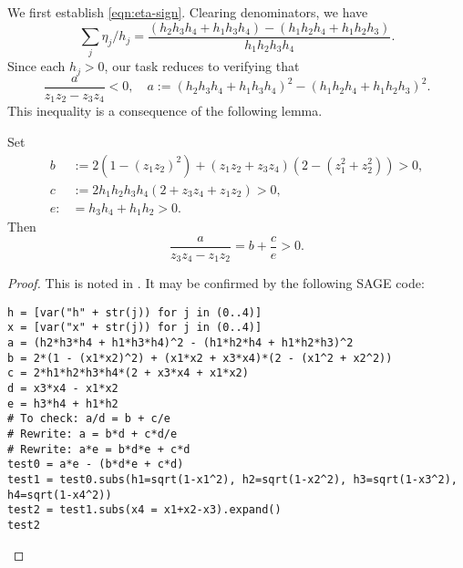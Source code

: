\documentclass[reqno]{amsart} 
\begin{document}
We first establish \eqref{eqn:eta-sign}.  Clearing denominators, we have
\begin{equation*}
  \sum _j \eta _j  / h _j
  = \frac{(h_2 h_3 h_4 + h_1 h_3 h_4) - (h_1 h_2 h_4 + h_1 h_2 h_3)}{ h_1 h_2 h_3 h_4}.
\end{equation*}
Since each $h_j > 0$, our task reduces to verifying that
\begin{equation*}
  \frac{a}{z_1 z_2 - z_3 z_4} < 0,
  \quad a := (h_2 h_3 h_4 + h_1 h_3 h_4)^2 - (h_1 h_2 h_4 + h_1 h_2 h_3)^2.
\end{equation*}
This inequality is a consequence of the following lemma.
\begin{lemma}
Set
\begin{align*}
  b &:= 2 (1 - (z _1 z _2 ) ^2) + (z _1 z _2 + z _3 z _4 ) (2 - (z _1^2 +  z _2^2 ) ) > 0, \\
  c &:= 2  h _1 h _2 h _3 h _4 (2 + z _3 z _4 + z _1 z _2) > 0, \\
  e :&= h_3 h_4 + h_1 h_2 > 0.
\end{align*}
Then
\begin{equation*}
  \frac{a}{z _3 z _4 - z _1 z _2 } = b + \frac{c}{e} > 0.
\end{equation*}
\end{lemma}
\begin{proof}
  This is noted in \cite{ki20234}.  It may be confirmed by the following SAGE code:
\begin{verbatim}
h = [var("h" + str(j)) for j in (0..4)]
x = [var("x" + str(j)) for j in (0..4)]
a = (h2*h3*h4 + h1*h3*h4)^2 - (h1*h2*h4 + h1*h2*h3)^2
b = 2*(1 - (x1*x2)^2) + (x1*x2 + x3*x4)*(2 - (x1^2 + x2^2))
c = 2*h1*h2*h3*h4*(2 + x3*x4 + x1*x2)
d = x3*x4 - x1*x2
e = h3*h4 + h1*h2
# To check: a/d = b + c/e
# Rewrite: a = b*d + c*d/e
# Rewrite: a*e = b*d*e + c*d
test0 = a*e - (b*d*e + c*d)
test1 = test0.subs(h1=sqrt(1-x1^2), h2=sqrt(1-x2^2), h3=sqrt(1-x3^2), h4=sqrt(1-x4^2))
test2 = test1.subs(x4 = x1+x2-x3).expand()
test2
\end{verbatim}
\end{proof}
\end{document}
